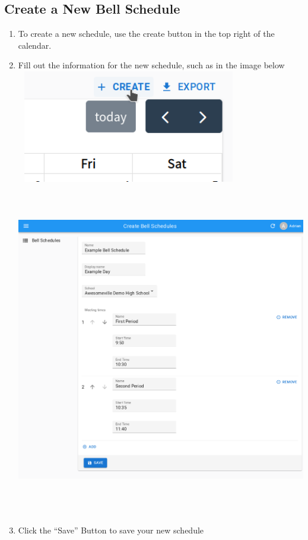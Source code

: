 \documentclass{article}
\begin{document}
\subsection{Create a New Bell Schedule}
\begin{enumerate}
\item {To create a new schedule, use the create button in the top right of the calendar.}
\item {Fill out the information for the new schedule, such as in the image below}
\includegraphics[width=3.8693in,height=1.9382in]{Mini20Manual-img010.png}
\includegraphics[width=6.5in,height=5.7717in]{Mini20Manual-img011.png}
\item {Click the “Save” Button to save your new schedule}
\end{enumerate}
\end{document}
